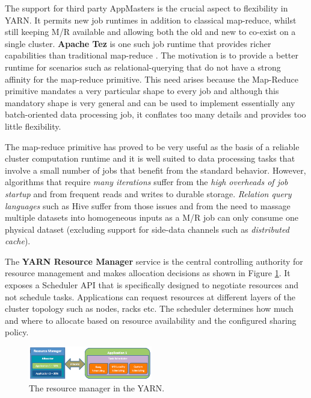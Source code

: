 \documentclass[twocolumn]{article}
\begin{document}
The support for third party AppMasters is the crucial aspect to flexibility in YARN.  It permits new job runtimes in addition to classical map-reduce, whilst still keeping M/R available and allowing both the old and new to co-exist on a single cluster.  \textbf{Apache Tez} is one such job runtime that provides richer capabilities than traditional map-reduce \cite{hortonworks}.  The motivation is to provide a better runtime for scenarios such as relational-querying that do not have a strong affinity for the map-reduce primitive.   This need arises because the Map-Reduce primitive mandates a very particular shape to every job and although this mandatory shape is very general and can be used to implement essentially any batch-oriented data processing job, it conflates too many details and provides too little flexibility.

The map-reduce primitive has proved to be very useful as the basis of a reliable cluster computation runtime and it is well suited to data processing tasks that involve a small number of jobs that benefit from the standard behavior.  However, algorithms that require \textit{many iterations} suffer from the \textit{high overheads of job startup} and from frequent reads and writes to durable storage.  \textit{Relation query languages} such as Hive suffer from those issues and from the need to massage multiple datasets into homogeneous inputs as a M/R job can only consume one physical dataset (excluding support for side-data channels such as \textit{distributed cache}).  

The \textbf{YARN Resource Manager} service is the central controlling authority for resource management and makes allocation decisions as shown in Figure \ref{yarn}. It exposes a Scheduler API that is specifically designed to negotiate resources and not schedule tasks. Applications can request resources at different layers of the cluster topology such as nodes, racks etc. The scheduler determines how much and where to allocate based on resource availability and the configured sharing policy.
\begin{figure}[htb]
        \centering
        \includegraphics[width=0.48\textwidth]{rm}
        \caption{The resource manager in the YARN.}
        \label{yarn}
\end{figure}
\end{document}
